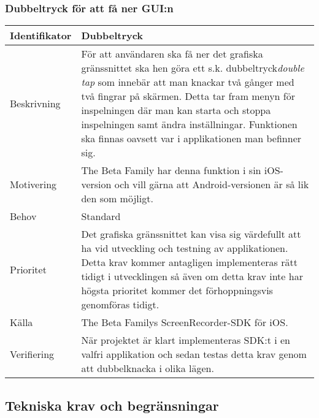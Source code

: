 \subsubsection{Dubbeltryck för att få ner GUI:n}
\begin{tabular}{ | p{65pt} | p{300pt} |}
  \hline
  Identifikator &
  Dubbeltryck
  \\ \hline
  Beskrivning & 
  För att användaren ska få ner det grafiska gränssnittet ska hen göra ett s.k. dubbeltryck\emph{double tap} som innebär att man knackar två gånger med två fingrar på skärmen. Detta tar fram menyn för inspelningen där man kan starta och stoppa inspelningen samt ändra inställningar. Funktionen ska finnas oavsett var i applikationen man befinner sig.
  \\ \hline
  Motivering &
  The Beta Family har denna funktion i sin iOS-version och vill gärna att Android-versionen är så lik den som möjligt.
  \\ \hline
  Behov &
  Standard
  \\ \hline
  Prioritet &
  Det grafiska gränssnittet kan visa sig värdefullt att ha vid utveckling och testning av applikationen. Detta krav kommer antagligen implementeras rätt tidigt i utvecklingen så även om detta krav inte har högsta prioritet kommer det förhoppningsvis genomföras tidigt.
  \\ \hline
  Källa &
  The Beta Familys ScreenRecorder-SDK för iOS.
  \\ \hline
  Verifiering &
När projektet är klart implementeras SDK:t i en valfri applikation och sedan testas detta krav genom att dubbelknacka i olika lägen.
  \\ \hline
  \end{tabular}

\subsection{Tekniska krav och begränsningar}
\label{subsec:techreq}


